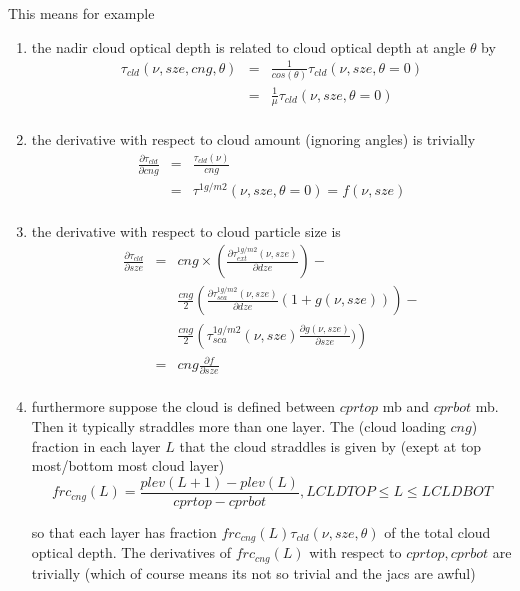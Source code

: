 \documentclass[11pt]{article}
\begin{document}
This means for example 
\begin{enumerate}
\item the nadir cloud optical depth is related to cloud optical depth at angle $\theta$ by
\begin{eqnarray*}
 \tau_{cld}(\nu,sze,cng,\theta) & = & \frac{1}{cos(\theta)} \tau_{cld}(\nu,sze,\theta = 0) \\
                          & = & \frac{1}{\mu} \tau_{cld}(\nu,sze,\theta = 0) \\
\end{eqnarray*}

\item the derivative with respect to cloud amount (ignoring angles) is trivially
\begin{eqnarray*}
\frac{\partial \tau_{cld}}{\partial cng} & = & \frac{\tau_{cld}(\nu)}{cng} \\
                                   & = & \tau^{1g/m2}(\nu,sze,\theta = 0) = f(\nu,sze) \\
\end{eqnarray*}

\item the derivative with respect to cloud particle size is
\begin{eqnarray*}
\frac{\partial \tau_{cld}}{\partial sze} & = & cng \times  \left( \frac{\partial \tau^{1g/m2}_{ext}(\nu,sze)}{\partial dze} \right) - \\
                                         &   & \frac{cng}{2} \left( \frac{\partial \tau^{1g/m2}_{sca}(\nu,sze)}{\partial dze} (1 + g(\nu,sze)) \right) - \\
                                         &   & \frac{cng}{2}  \left(  \tau^{1g/m2}_{sca}(\nu,sze) \frac{\partial g(\nu,sze)}{\partial sze}) \right) \\
                                         & = & cng \frac{\partial f}{\partial sze} \\
\end{eqnarray*}

\item furthermore suppose the cloud is defined between $cprtop$ mb and
  $cprbot$ mb. Then it typically straddles more than one layer. The
  (cloud loading $cng$) fraction in each layer $L$ that the cloud
  straddles is given by (exept at top most/bottom most cloud layer)
\[
  frc_{cng}(L) = \frac{plev(L+1)-plev(L)}{cprtop-cprbot}, LCLDTOP \le L \le LCLDBOT
\]

so that each layer has fraction $frc_{cng}(L)
\tau_{cld}(\nu,sze,\theta)$ of the total cloud optical depth. The
derivatives of $frc_{cng}(L)$ with respect to $cprtop,cprbot$ are
trivially (which of course means its not so trivial and the jacs are awful)


\end{enumerate}
\end{document}
